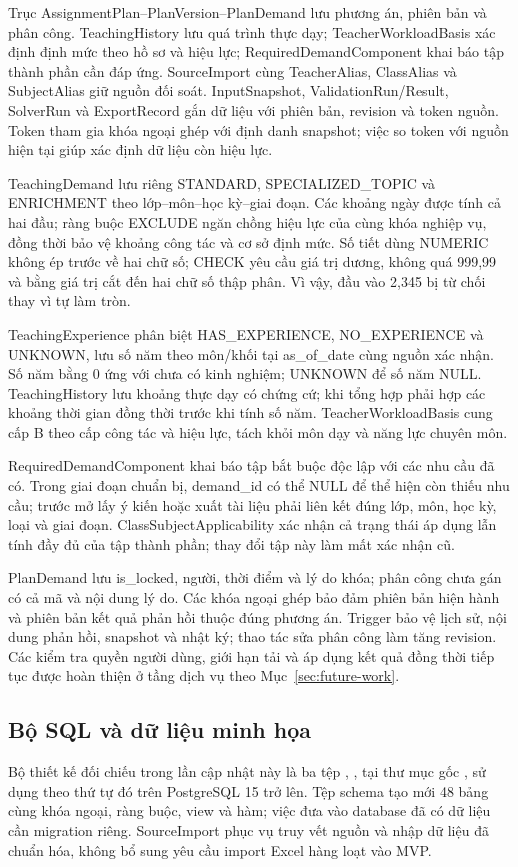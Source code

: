 \documentclass[12pt,a4paper]{report}
\newcommand{\code}[1]{\texttt{\detokenize{#1}}}
\newcommand{\diagramtext}[1]{\begingroup\clubpenalty=10000\widowpenalty=10000 #1\par\endgroup}
\begin{document}
\diagramtext{Trục AssignmentPlan--PlanVersion--PlanDemand lưu phương án, phiên bản và phân công. TeachingHistory lưu quá trình thực dạy; TeacherWorkloadBasis xác định định mức theo hồ sơ và hiệu lực; RequiredDemandComponent khai báo tập thành phần cần đáp ứng. SourceImport cùng TeacherAlias, ClassAlias và SubjectAlias giữ nguồn đối soát. InputSnapshot, ValidationRun/Result, SolverRun và ExportRecord gắn dữ liệu với phiên bản, revision và token nguồn. Token tham gia khóa ngoại ghép với định danh snapshot; việc so token với nguồn hiện tại giúp xác định dữ liệu còn hiệu lực.}

TeachingDemand lưu riêng STANDARD, SPECIALIZED\_TOPIC và ENRICHMENT theo lớp--môn--học kỳ--giai đoạn. Các khoảng ngày được tính cả hai đầu; ràng buộc EXCLUDE ngăn chồng hiệu lực của cùng khóa nghiệp vụ, đồng thời bảo vệ khoảng công tác và cơ sở định mức. Số tiết dùng NUMERIC không ép trước về hai chữ số; CHECK yêu cầu giá trị dương, không quá 999,99 và bằng giá trị cắt đến hai chữ số thập phân. Vì vậy, đầu vào 2,345 bị từ chối thay vì tự làm tròn.

TeachingExperience phân biệt HAS\_EXPERIENCE, NO\_EXPERIENCE và UNKNOWN, lưu số năm theo môn/khối tại as\_of\_date cùng nguồn xác nhận. Số năm bằng 0 ứng với chưa có kinh nghiệm; UNKNOWN để số năm NULL. TeachingHistory lưu khoảng thực dạy có chứng cứ; khi tổng hợp phải hợp các khoảng thời gian đồng thời trước khi tính số năm. TeacherWorkloadBasis cung cấp B theo cấp công tác và hiệu lực, tách khỏi môn dạy và năng lực chuyên môn.

RequiredDemandComponent khai báo tập bắt buộc độc lập với các nhu cầu đã có. Trong giai đoạn chuẩn bị, demand\_id có thể NULL để thể hiện còn thiếu nhu cầu; trước mở lấy ý kiến hoặc xuất tài liệu phải liên kết đúng lớp, môn, học kỳ, loại và giai đoạn. ClassSubjectApplicability xác nhận cả trạng thái áp dụng lẫn tính đầy đủ của tập thành phần; thay đổi tập này làm mất xác nhận cũ.

PlanDemand lưu is\_locked, người, thời điểm và lý do khóa; phân công chưa gán có cả mã và nội dung lý do. Các khóa ngoại ghép bảo đảm phiên bản hiện hành và phiên bản kết quả phản hồi thuộc đúng phương án. Trigger bảo vệ lịch sử, nội dung phản hồi, snapshot và nhật ký; thao tác sửa phân công làm tăng revision. Các kiểm tra quyền người dùng, giới hạn tải và áp dụng kết quả đồng thời tiếp tục được hoàn thiện ở tầng dịch vụ theo Mục~\ref{sec:future-work}.

\subsection{Bộ SQL và dữ liệu minh họa}
Bộ thiết kế đối chiếu trong lần cập nhật này là ba tệp \code{01_schema.sql}, \code{02_seed.sql}, \code{03_queries.sql} tại thư mục gốc \code{DACN/}, sử dụng theo thứ tự đó trên PostgreSQL 15 trở lên. Tệp schema tạo mới 48 bảng cùng khóa ngoại, ràng buộc, view và hàm; việc đưa vào database đã có dữ liệu cần migration riêng. SourceImport phục vụ truy vết nguồn và nhập dữ liệu đã chuẩn hóa, không bổ sung yêu cầu import Excel hàng loạt vào MVP.
\end{document}
